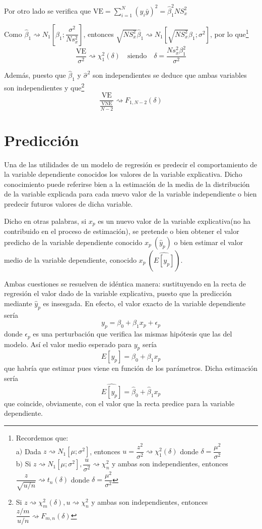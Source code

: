 \documentclass[10pt,a4paper]{book}
\begin{document}
Por otro lado se verifica que $\mathrm{VE}=\displaystyle\sum^N_{i=1}(\widehat{y}_i\bar{y})^2=\widehat{\beta}^2_1NS^2_x$

Como $\widehat{\beta}_1\rightsquigarrow N_1\left[\beta_1;\dfrac{\sigma^2}{Ns^2_x}\right]$, entonces $\sqrt{NS^2_x}\widehat{\beta}_1\rightsquigarrow  N_1\left[\sqrt{NS^2_x}\beta_1;\sigma^2\right]$, por lo que\footnote{ Recordemos que:\\ a$)$ Dada $z\rightsquigarrow N_1[\mu;\sigma^2]$, entonces $u=\dfrac{z^2}{\sigma^2}\rightsquigarrow \chi^2_1(\delta)$ donde $\delta=\dfrac{\mu^2}{\sigma^2}$\\ b$)$ Si $z\rightsquigarrow N_1[\mu;\sigma^2],\dfrac{u}{\sigma^2}\rightsquigarrow \chi^2_n$ y ambas son independientes, entonces $\dfrac{z}{\sqrt{u/n}}\rightsquigarrow t_n(\delta)$ donde $\delta=\dfrac{\mu^2}{\sigma^2}$} $$\dfrac{\mathrm{VE}}{\sigma^2}\rightsquigarrow \chi^2_1(\delta)\quad \mathrm{siendo}\quad \delta=\dfrac{Ns^2_x\beta^2_1}{\sigma^2}$$

Además, puesto que $\widehat{\beta}_1$ y $\widehat{\sigma}^2$ son independientes se deduce que ambas variables son independientes y que\footnote{ Si $z\rightsquigarrow \chi^2_m(\delta),u\rightsquigarrow \chi^2_n$ y ambas son independientes, entonces $\dfrac{z/m}{u/n}\rightsquigarrow F_{m,n}(\delta)$} $$\dfrac{\mathrm{VE}}{\frac{\mathrm{VNE}}{N-2}}\rightsquigarrow F_{1,N-2}(\delta)$$
	\section{Predicción}
Una de las utilidades de un modelo de regresión es predecir el comportamiento de la variable dependiente conocidos los valores de la variable explicativa. Dicho conocimiento puede referirse bien a la estimación de la media de la distribución de la variable explicada para cada nuevo valor de la variable independiente o bien predecir futuros valores de dicha variable.

Dicho en otras palabras, si $x_p$ es un nuevo valor de la variable explicativa(no ha contribuido en el proceso de estimación), se pretende o bien obtener el valor predicho de la variable dependiente conocido $x_p\ (\widehat{y}_p)$ o bien estimar el valor medio de la variable dependiente, conocido $x_p\ (\widehat{E[y_p]})$.

Ambas cuestiones se resuelven de idéntica manera: sustituyendo en la recta de regresión el valor dado de la variable explicativa, puesto que la predicción mediante $\widehat{y}_p$ es insesgada. En efecto, el valor exacto de la variable dependiente sería $$y_p=\beta_0+\beta_1x_p+\epsilon_p$$ donde $\epsilon_p$ es una perturbación que verifica las mismas hipótesis que las del modelo. Así el valor medio esperado para $y_p$ sería $$E[y_p]=\beta_0+\beta_1x_p$$ que habría que estimar pues viene en función de los parámetros. Dicha estimación sería $$\widehat{E[y_p]}=\widehat{\beta}_0+\widehat{\beta}_1x_p$$ que coincide, obviamente, con el valor que la recta predice para la variable dependiente.
\end{document}
